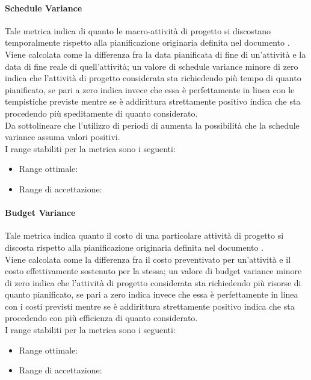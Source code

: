 			\paragraph{Schedule Variance}
			Tale metrica indica di quanto le macro-attività di progetto si discostano temporalmente rispetto alla pianificazione originaria definita nel documento \PdP . 
			\\Viene calcolata come la differenza fra la data pianificata di fine di un'attività e la data di fine reale di quell'attività; un valore di schedule variance minore di zero indica che l'attività di progetto considerata sta richiedendo più tempo di quanto pianificato, se pari a zero indica invece che essa è perfettamente in linea con le tempistiche previste mentre se è addirittura strettamente positivo indica che sta procedendo più speditamente di quanto considerato. 
			\\Da sottolineare che l'utilizzo di periodi di  aumenta la possibilità che la schedule variance assuma valori positivi.
\\I range stabiliti per la metrica sono i seguenti:
				\begin{itemize}
					\item Range ottimale:
					\item Range di accettazione:
				\end{itemize}

			\paragraph{Budget Variance}
			Tale metrica indica quanto il costo di una particolare attività di progetto si discosta rispetto alla pianificazione originaria definita nel documento \PdP. 
			\\Viene calcolata come la differenza fra il costo preventivato per un'attività e il costo effettivamente sostenuto per la stessa; un valore di budget variance minore di zero indica che l'attività di progetto considerata sta richiedendo più risorse di quanto pianificato, se pari a zero indica invece che essa è perfettamente in linea con i costi previsti mentre se è addirittura strettamente positivo indica che sta procedendo con più efficienza di quanto considerato.
\\I range stabiliti per la metrica sono i seguenti:
			\begin{itemize}
					\item Range ottimale:
					\item Range di accettazione:
				\end{itemize}
				
